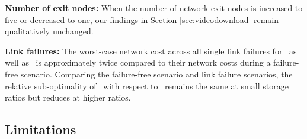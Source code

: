 \textbf{Number of exit nodes:} When the number of network exit nodes is increased to five or decreased to one, our findings in Section \ref{sec:videodownload} remain qualitatively unchanged.




\textbf{Link failures:} The worst-case network cost across all single link failures for \invlru\ as well as \optrpfuture\ is approximately twice compared to their network costs during  a failure-free scenario. Comparing the failure-free scenario and link failure scenarios, the relative sub-optimality of \invlru\ with respect to \optrpfuture\ remains the same at small storage ratios but reduces at higher  ratios. 


\subsection{Limitations}

